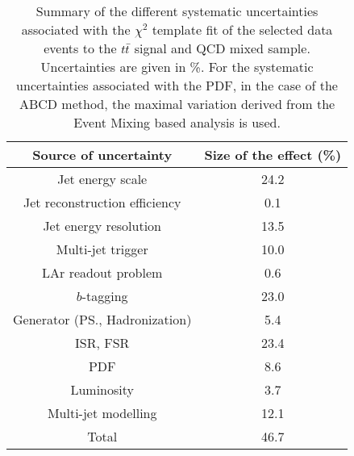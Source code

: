     \begin{table}[!h]
    \begin{center}
      \begin{tabular}{c|c}
          \hline
              \hline
              Source of uncertainty            &  Size of the effect (\%)\\
              \hline
              Jet energy scale              &          24.2    \\
              Jet reconstruction efficiency &           0.1    \\
              Jet energy resolution         &          13.5    \\
              Multi-jet trigger             &          10.0    \\
              LAr readout problem           &           0.6    \\
              $b$-tagging                   &          23.0    \\
              Generator (PS., Hadronization)&           5.4    \\
              ISR, FSR                      &          23.4    \\
              PDF                           &           8.6    \\
              Luminosity                    &           3.7    \\
              Multi-jet modelling           &          12.1    \\
              \hline
              \hline
              Total                         &          46.7    \\
              \hline
              \hline

              \end{tabular}
              \end{center}
               \caption{Summary of the different systematic uncertainties associated with the $\chi^2$
                template fit of the selected data events to the $t\bar{t}$ signal and \mj
                 QCD mixed sample. Uncertainties are given in \%. For the systematic uncertainties associated with the PDF, in the case of the ABCD method, the maximal variation derived from the Event Mixing based analysis is used.}
                   \label{tab:finaluncertainties}
                   \end{table}

